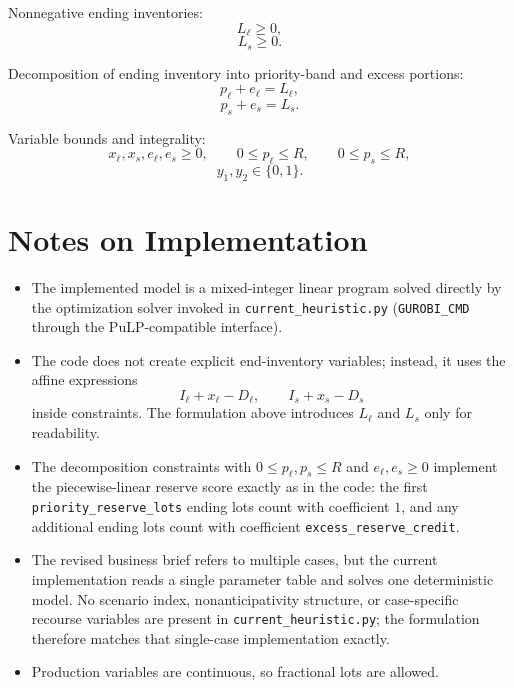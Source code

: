 Nonnegative ending inventories:
\[
L_\ell \ge 0,
\]
\[
L_s \ge 0.
\]

Decomposition of ending inventory into priority-band and excess portions:
\[
p_\ell + e_\ell = L_\ell,
\]
\[
p_s + e_s = L_s.
\]

Variable bounds and integrality:
\[
x_\ell,x_s,e_\ell,e_s \ge 0,\qquad 0 \le p_\ell \le R,\qquad 0 \le p_s \le R,
\]
\[
y_1,y_2 \in \{0,1\}.
\]

\section*{Notes on Implementation}

\begin{itemize}
    \item The implemented model is a mixed-integer linear program solved directly by the optimization solver invoked in \texttt{current\_heuristic.py} (\texttt{GUROBI\_CMD} through the PuLP-compatible interface).
    \item The code does not create explicit end-inventory variables; instead, it uses the affine expressions
    \[
    I_\ell + x_\ell - D_\ell,\qquad I_s + x_s - D_s
    \]
    inside constraints. The formulation above introduces $L_\ell$ and $L_s$ only for readability.
    \item The decomposition constraints with $0 \le p_\ell,p_s \le R$ and $e_\ell,e_s \ge 0$ implement the piecewise-linear reserve score exactly as in the code: the first \texttt{priority\_reserve\_lots} ending lots count with coefficient $1$, and any additional ending lots count with coefficient \texttt{excess\_reserve\_credit}.
    \item The revised business brief refers to multiple cases, but the current implementation reads a single parameter table and solves one deterministic model. No scenario index, nonanticipativity structure, or case-specific recourse variables are present in \texttt{current\_heuristic.py}; the formulation therefore matches that single-case implementation exactly.
    \item Production variables are continuous, so fractional lots are allowed.
\end{itemize}

